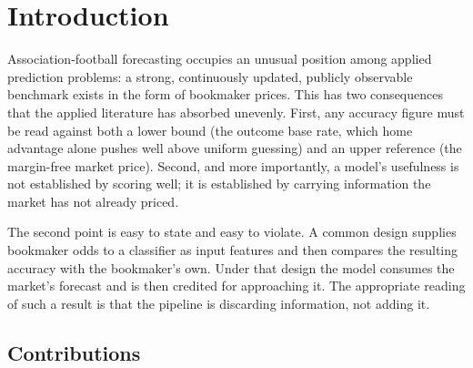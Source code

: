 \documentclass[11pt]{article}
\begin{document}
\section{Introduction}
\label{sec:intro}

Association-football forecasting occupies an unusual position among applied
prediction problems: a strong, continuously updated, publicly observable
benchmark exists in the form of bookmaker prices. This has two consequences
that the applied literature has absorbed unevenly. First, any accuracy figure
must be read against both a lower bound (the outcome base rate, which home
advantage alone pushes well above uniform guessing) and an upper reference (the
margin-free market price). Second, and more importantly, a model's usefulness
is not established by scoring well; it is established by carrying information
the market has not already priced.

The second point is easy to state and easy to violate. A common design supplies
bookmaker odds to a classifier as input features and then compares the
resulting accuracy with the bookmaker's own. Under that design the model
consumes the market's forecast and is then credited for approaching it. The
appropriate reading of such a result is that the pipeline is discarding
information, not adding it.

\subsection{Contributions}
\end{document}
